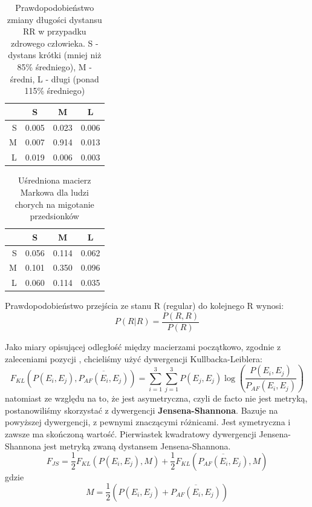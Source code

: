 \begin{table}[!ht]
  \centering
  \begin{tabular}{|r|ccc|}
    \hline 
    & S & M & L \\
    \hline
    S & 0.005 & 0.023 & 0.006 \\
    M & 0.007 & 0.914 & 0.013 \\
    L & 0.019 & 0.006 & 0.003 \\
    \hline
  \end{tabular}
  \caption[Macierz Markowa - zdrowy człowiek]
          {Prawdopodobieństwo zmiany długości dystansu RR w przypadku zdrowego człowieka. 
            S - dystans krótki (mniej niż 85\% średniego), 
            M - średni, L - długi (ponad 115\% średniego)}
\end{table}

\begin{table}[!ht]
  \centering
  \begin{tabular}{|r|ccc|}
    \hline 
    & S & M & L \\
    \hline
    S & 0.056 & 0.114 & 0.062 \\
    M & 0.101 & 0.350 & 0.096 \\
    L & 0.060 & 0.114 & 0.035 \\
    \hline
  \end{tabular}
  \caption[Macierz Markowa - chory człowiek]{Uśredniona macierz Markowa dla ludzi chorych na migotanie przedsionków}
\end{table}

Prawdopodobieństwo przejścia ze stanu R (regular) do kolejnego R wynosi:
\begin{equation}
P(R|R) = \frac{P(R,R)}{P(R)}
\end{equation}

Jako miary opisującej odległość między macierzami początkowo, zgodnie z zaleceniami pozycji \cite{Pedrycz}, 
chcieliśmy użyć dywergencji Kullbacka-Leiblera:
\begin{equation}
F_{KL}(P(E_i,E_j),\overline{P_{AF}(E_i,E_j)}) = \sum_{i=1}^3\sum_{j=1}^3P(E_j, E_j) \log\left(\frac{P(E_i, E_j)}{P_{AF}(E_i,E_j)} \right)
\end{equation}
natomiast ze względu na to, że jest asymetryczna, czyli de facto nie jest metryką, postanowiliśmy skorzystać z dywergencji \textbf{Jensena-Shannona}. 
Bazuje na powyższej dywergencji, z pewnymi znaczącymi różnicami.
Jest symetryczna i zawsze ma skończoną wartość.
Pierwiastek kwadratowy dywergencji Jensena-Shannona jest metryką zwaną dystansem Jensena-Shannona.
\begin{equation}
F_{JS} = \frac{1}{2}F_{KL}(P(E_i,E_j),M)+\frac{1}{2}F_{KL}(\overline{P_{AF}(E_i,E_j)},M)
\end{equation}
gdzie $$M = \frac{1}{2}(P(E_i,E_j)+\overline{P_{AF}(E_i,E_j)})$$

